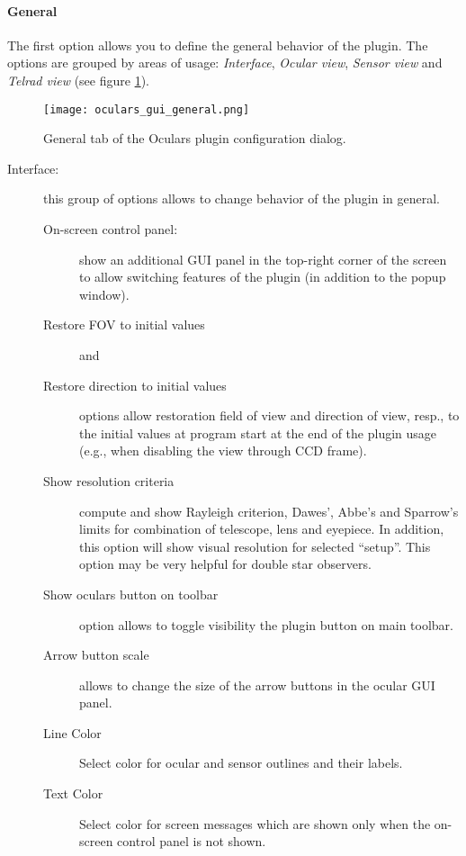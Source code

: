 \paragraph{General}

The first option allows you to define the general behavior of the plugin. 
The options are grouped by areas of usage: \emph{Interface}, \emph{Ocular view}, \emph{Sensor view} and \emph{Telrad view} (see figure \ref{fig:plugins:Oculars:Gui:General}).

\begin{figure}[ht]\centering
\texttt{[image: oculars\_gui\_general.png]}
\caption{General tab of the Oculars plugin configuration dialog.}
\label{fig:plugins:Oculars:Gui:General}
\end{figure}

\begin{description}
\item[Interface:] this group of options allows to change behavior of the plugin in general.
 \begin{description}
   \item[On-screen control panel:] show an additional GUI panel in the top-right corner of the screen to allow switching features of the plugin (in addition to the popup window).
   \item[Restore FOV to initial values] and
   \item[Restore direction to initial values] options allow restoration field of view and direction of view, resp., 
         to the initial values at program start at the end of the plugin usage (e.g., when disabling the view through CCD frame).
   \item[Show resolution criteria] compute and show Rayleigh criterion, Dawes', Abbe's and Sparrow's limits for combination of telescope, lens and eyepiece.
         In addition, this option will show visual resolution for selected ``setup''. This option may be very helpful for double star observers.
   \item[Show oculars button on toolbar] option allows to toggle visibility the plugin button on main toolbar. 
   \item[Arrow button scale] allows to change the size of the arrow buttons in the ocular GUI panel. 
   \item[Line Color] Select  color for ocular and sensor outlines and their labels.
   \item[Text Color] Select  color for screen messages which are shown only when the on-screen control panel is not shown.

\end{description}
\end{description}
